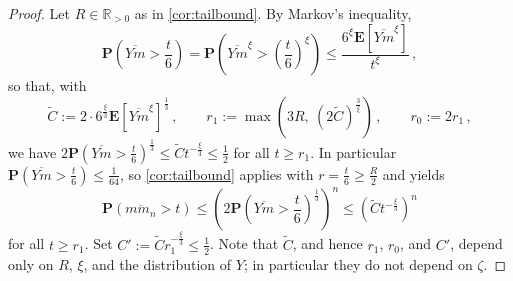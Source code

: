 \documentclass{article}
\newcommand{\R}{\mathbb{R}}
\newcommand{\Rpp}{\R_{>0}}
\newcommand{\lb}{\left(} %
\newcommand{\rb}{\right)} %
\newcommand{\br}[1]{\lb #1 \rb} %
\newcommand{\brOf}[1]{\!\br{#1}} %
\renewcommand{\Pr}{\mathbf{P}} %
\newcommand{\PrOf}[1]{\Pr\brOf{#1}}
\newcommand{\E}{\mathbf{E}} %
\newcommand{\Eof}[1]{\E[#1]}
\newcommand{\eqcm}{\,,} %
\newcommand{\ol}[2]{\overline{#1#2}}
\begin{document}
\begin{proof}
    Let $R \in \Rpp$ as in \cref{cor:tailbound}.
    By Markov's inequality,
    \begin{equation}
        \PrOf{\ol Ym > \frac t6}
        =
        \PrOf{\ol Ym^\xi > \br{\frac t6}^\xi}
        \leq
        \frac{6^\xi\Eof{\ol Ym^\xi}}{t^\xi}
        \eqcm
    \end{equation}
    so that, with
    \begin{equation}
        \tilde C := 2 \cdot 6^{\frac{\xi}3} \Eof{\ol Ym^\xi}^{\frac13}
        \eqcm
        \qquad
        r_1 := \max\br{3R,\ \br{2\tilde C}^{\frac3\xi}}
        \eqcm
        \qquad
        r_0 := 2 r_1
        \eqcm
    \end{equation}
    we have $2\PrOf{\ol Ym > \frac t6}^{\frac13} \leq \tilde C t^{-\frac\xi3} \leq \frac12$ for all
    $t \geq r_1$. In particular $\PrOf{\ol Ym > \frac t6} \leq \frac1{64}$, so
    \cref{cor:tailbound} applies with $r = \frac t6 \geq \frac R2$ and yields
    \begin{equation}\label{eq:tail:t}
        \PrOf{\ol m{m_n} > t}
        \leq
        \br{2\PrOf{\ol Ym > \frac t6}^{\frac13}}^n
        \leq
        \br{\tilde C t^{-\frac{\xi}3}}^n
    \end{equation}
    for all $t \geq r_1$. Set $C' := \tilde C r_1^{-\frac{\xi}3} \leq \frac12$.
    Note that $\tilde C$, and hence $r_1$, $r_0$, and $C'$, depend only on $R$, $\xi$, and the
    distribution of $Y$; in particular they do not depend on $\zeta$.
    

\end{proof}
\end{document}
